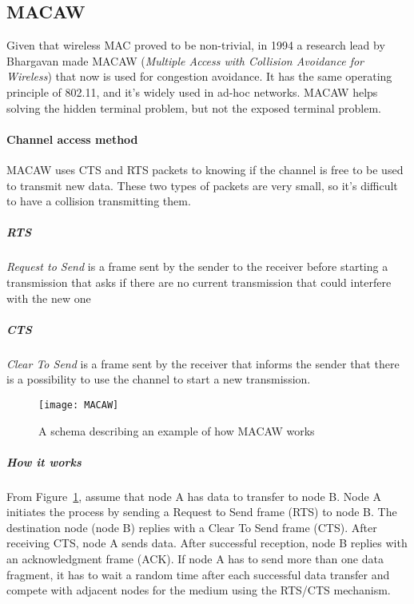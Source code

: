 \subsection{MACAW} 

Given that wireless MAC proved to be non-trivial, in 1994 a research lead by
Bhargavan made MACAW (\textit{Multiple Access with Collision Avoidance for
  Wireless}) that now is used for congestion avoidance. It has the same
operating principle of 802.11, and it's widely used in ad-hoc networks.
MACAW helps solving the hidden terminal problem, but not the exposed terminal
problem.

\paragraph*{Channel access method}
MACAW uses CTS and RTS packets to knowing if the channel is free to be used to
transmit new data. These two types of packets are very small, so it's difficult
to have a collision transmitting them.

\subparagraph*{RTS} \textit{Request to Send} is a frame sent by the
sender to the receiver before starting a transmission that asks if there are no
current transmission that could interfere with the new one

\subparagraph*{CTS} \textit{Clear To Send} is a frame sent by the receiver
that informs the sender that there is a possibility to use the channel to start
a new transmission.

\begin{figure}[t]
  \centering
  \texttt{[image: MACAW]}
  \caption{A schema describing an example of how MACAW works}
  \label{fig:mac:macaw}
\end{figure}

\subparagraph*{How it works} From Figure~\ref{fig:mac:macaw}, assume that node A
has data to transfer to node B.
Node A initiates the process by sending a Request to Send frame (RTS) to node B.
The destination node (node B) replies with a Clear To Send frame (CTS). After
receiving CTS, node A sends data. After successful reception, node B replies
with an acknowledgment frame (ACK). If node A has to send more than one data
fragment, it has to wait a random time after each successful data transfer and
compete with adjacent nodes for the medium using the RTS/CTS mechanism.

